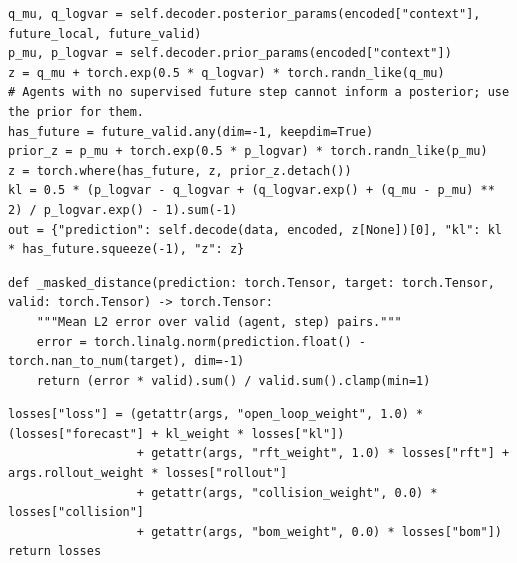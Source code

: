 \documentclass[10pt]{article}
\begin{document}
\par\smallskip{}\par\nopagebreak
\begin{lstlisting}[aboveskip=2pt]
q_mu, q_logvar = self.decoder.posterior_params(encoded["context"], future_local, future_valid)
p_mu, p_logvar = self.decoder.prior_params(encoded["context"])
z = q_mu + torch.exp(0.5 * q_logvar) * torch.randn_like(q_mu)
# Agents with no supervised future step cannot inform a posterior; use the prior for them.
has_future = future_valid.any(dim=-1, keepdim=True)
prior_z = p_mu + torch.exp(0.5 * p_logvar) * torch.randn_like(p_mu)
z = torch.where(has_future, z, prior_z.detach())
kl = 0.5 * (p_logvar - q_logvar + (q_logvar.exp() + (q_mu - p_mu) ** 2) / p_logvar.exp() - 1).sum(-1)
out = {"prediction": self.decode(data, encoded, z[None])[0], "kl": kl * has_future.squeeze(-1), "z": z}
\end{lstlisting}

\par\smallskip{}\par\nopagebreak
\begin{lstlisting}[aboveskip=2pt]
def _masked_distance(prediction: torch.Tensor, target: torch.Tensor, valid: torch.Tensor) -> torch.Tensor:
    """Mean L2 error over valid (agent, step) pairs."""
    error = torch.linalg.norm(prediction.float() - torch.nan_to_num(target), dim=-1)
    return (error * valid).sum() / valid.sum().clamp(min=1)

\end{lstlisting}

\par\smallskip{}\par\nopagebreak
\begin{lstlisting}[aboveskip=2pt]
losses["loss"] = (getattr(args, "open_loop_weight", 1.0) * (losses["forecast"] + kl_weight * losses["kl"])
                  + getattr(args, "rft_weight", 1.0) * losses["rft"] + args.rollout_weight * losses["rollout"]
                  + getattr(args, "collision_weight", 0.0) * losses["collision"]
                  + getattr(args, "bom_weight", 0.0) * losses["bom"])
return losses
\end{lstlisting}
\end{document}
